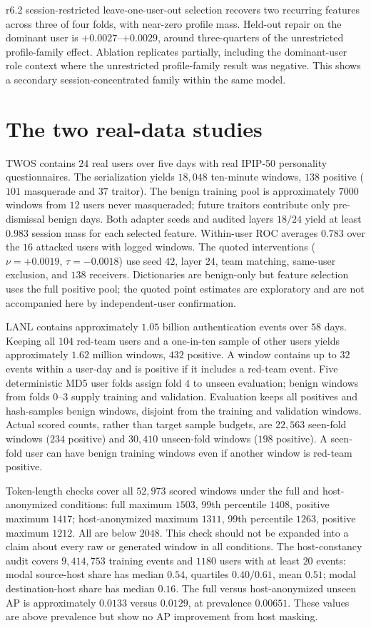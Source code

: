 r6.2 session-restricted leave-one-user-out selection recovers two recurring
features across three of four folds, with near-zero profile mass.
Held-out repair on the dominant user is $+0.0027$--$+0.0029$, around
three-quarters of the unrestricted profile-family effect. Ablation
replicates partially, including the dominant-user role context where
the unrestricted profile-family result was negative. This shows a
secondary session-concentrated family within the same model.

\section{The two real-data studies}
\label{app:realdata}

TWOS contains $24$ real users over five days with real IPIP-50 personality
questionnaires. The serialization yields $18{,}048$ ten-minute windows,
$138$ positive ($101$ masquerade and $37$ traitor). The benign training
pool is approximately $7000$ windows from $12$ users never masqueraded;
future traitors contribute only pre-dismissal benign days. Both adapter
seeds and audited layers $18/24$ yield at least $0.983$ session mass
for each selected feature. Within-user ROC averages $0.783$ over the
$16$ attacked users with logged windows. The quoted interventions
($\nu=+0.0019$, $\tau=-0.0018$) use seed $42$, layer $24$,
team matching, same-user exclusion, and $138$ receivers. Dictionaries
are benign-only but feature selection uses the full positive pool;
the quoted point estimates are exploratory and are not accompanied
here by independent-user confirmation.

LANL contains approximately $1.05$ billion authentication events over
$58$ days. Keeping all $104$ red-team users and a one-in-ten sample
of other users yields approximately $1.62$ million windows, $432$
positive. A window contains up to $32$ events within a user-day and
is positive if it includes a red-team event. Five deterministic MD5
user folds assign fold $4$ to unseen evaluation; benign windows from
folds $0$--$3$ supply training and validation. Evaluation keeps all
positives and hash-samples benign windows, disjoint from the training
and validation windows. Actual scored counts, rather than target sample
budgets, are $22{,}563$ seen-fold windows ($234$ positive) and
$30{,}410$ unseen-fold windows ($198$ positive). A seen-fold user can
have benign training windows even if another window is red-team positive.

Token-length checks cover all $52{,}973$ scored windows under the full
and host-anonymized conditions: full maximum $1503$, 99th percentile
$1408$, positive maximum $1417$; host-anonymized maximum $1311$,
99th percentile $1263$, positive maximum $1212$. All are below $2048$.
This check should not be expanded into a claim about every raw or
generated window in all conditions. The host-constancy audit covers
$9{,}414{,}753$ training events and $1180$ users with at least $20$
events: modal source-host share has median $0.54$, quartiles
$0.40/0.61$, mean $0.51$; modal destination-host share has median
$0.16$. The full versus host-anonymized unseen AP is approximately
$0.0133$ versus $0.0129$, at prevalence $0.00651$. These values are
above prevalence but show no AP improvement from host masking.

